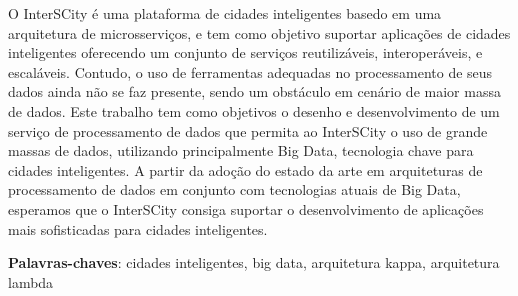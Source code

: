\begin{resumo}

    O InterSCity é uma plataforma de cidades inteligentes basedo em uma
    arquitetura de microsserviços, e tem como objetivo suportar aplicações de %
    cidades inteligentes oferecendo um conjunto de serviços reutilizáveis,
    interoperáveis, e escaláveis. Contudo, o uso de ferramentas adequadas no
    processamento de seus dados ainda não se faz presente, sendo um obstáculo
    em cenário de maior massa de dados. Este trabalho tem como objetivos o
    desenho e desenvolvimento de um serviço de processamento de dados que
    permita ao InterSCity o uso de grande massas de dados, utilizando
    principalmente Big Data, tecnologia chave para cidades inteligentes. A
    partir da adoção do estado da arte em arquiteturas de processamento de
    dados em conjunto com tecnologias atuais de Big Data, esperamos que o
    InterSCity consiga suportar o desenvolvimento de aplicações mais
    sofisticadas para cidades inteligentes.

 \vspace{\onelineskip}
 \noindent
 \textbf{Palavras-chaves}: cidades inteligentes, big data, arquitetura kappa, arquitetura lambda
\end{resumo}
